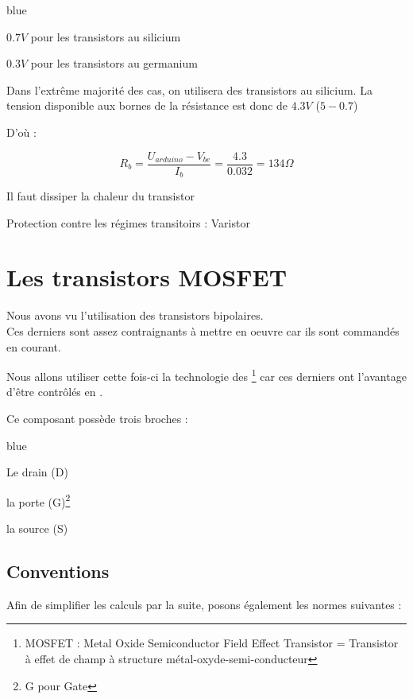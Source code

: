 {\begin{items}{blue}{\Triangle}
      \item $0.7V$ pour les transistors au silicium
      \item $0.3V$ pour les transistors au germanium
    \end{items}
    Dans l'extrême majorité des cas, on utilisera des transistors au silicium. La tension disponible aux bornes de la résistance est donc de $4.3V$ ($5-0.7$)

    D'où : 

    $$ \boxed{ R_{b} = \frac{U_{arduino}-V_{be}}{I_b} = \frac{4.3}{0.032} = 134 \Omega} $$


Il faut dissiper la chaleur du transistor


Protection contre les régimes transitoirs : Varistor 



\section{Les transistors MOSFET}

     Nous avons vu l'utilisation des transistors bipolaires. \\
     Ces derniers sont assez contraignants à mettre en oeuvre car ils sont commandés en courant.

     Nous allons utiliser cette fois-ci la technologie des  \footnote{MOSFET : Metal Oxide Semiconductor Field Effect Transistor = Transistor à effet de champ à structure métal-oxyde-semi-conducteur} car ces derniers ont l'avantage d'être contrôlés en .

     Ce composant possède trois broches : 
     
     \begin{items}{blue}{\Triangle}
     
       \item Le drain (D)
       \item la porte (G)\footnote{G pour Gate}
       \item la source (S)
     
     \end{items}
     
     
     \subsection{Conventions}
     
     Afin de simplifier les calculs par la suite, posons également les normes suivantes : 
     
}
